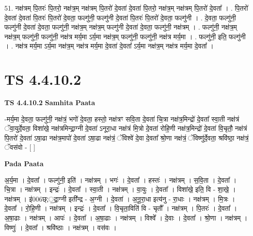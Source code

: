 \documentclass[17pt]{extarticle}
\begin{document}
51. नक्ष॑त्रम् पि॒तरः॑ पि॒तरो॒ नक्ष॑त्र॒म् नक्ष॑त्रम् पि॒तरो॑ दे॒वता॑ दे॒वता॑ पि॒तरो॒ नक्ष॑त्र॒म् नक्ष॑त्रम् पि॒तरो॑ दे॒वता᳚ । . पि॒तरो॑ दे॒वता॑ दे॒वता॑ पि॒तरः॑ पि॒तरो॑ दे॒वता॒ फल्गु॑नी॒ फल्गु॑नी दे॒वता॑ पि॒तरः॑ पि॒तरो॑ दे॒वता॒ फल्गु॑नी । . दे॒वता॒ फल्गु॑नी॒ फल्गु॑नी दे॒वता॑ दे॒वता॒ फल्गु॑नी॒ नक्ष॑त्र॒म् नक्ष॑त्र॒म् फल्गु॑नी दे॒वता॑ दे॒वता॒ फल्गु॑नी॒ नक्ष॑त्रम् । . फल्गु॑नी॒ नक्ष॑त्र॒म् नक्ष॑त्र॒म् फल्गु॑नी॒ फल्गु॑नी॒ नक्ष॑त्र मर्य॒मा ऽर्य॒मा नक्ष॑त्र॒म् फल्गु॑नी॒ फल्गु॑नी॒ नक्ष॑त्र मर्य॒मा । . फल्गु॑नी॒ इति॒ फल्गु॑नी । . नक्ष॑त्र मर्य॒मा ऽर्य॒मा नक्ष॑त्र॒म् नक्ष॑त्र मर्य॒मा दे॒वता॑ दे॒वता᳚ ऽर्य॒मा नक्ष॑त्र॒म् नक्ष॑त्र मर्य॒मा दे॒वता᳚ । \newline
\pagebreak
{}

\section{ TS 4.4.10.2 }

\textbf{TS 4.4.10.2 } \newline
\textbf{Samhita Paata} \newline

-मर्य॒मा दे॒वता॒ फल्गु॑नी॒ नक्ष॑त्रं॒ भगो॑ दे॒वता॒ हस्तो॒ नक्ष॑त्रꣳ सवि॒ता दे॒वता॑ चि॒त्रा नक्ष॑त्र॒मिन्द्रो॑ दे॒वता᳚ स्वा॒ती नक्ष॑त्रं ॅवा॒युर्दे॒वता॒ विशा॑खे॒ नक्ष॑त्रमिन्द्रा॒ग्नी दे॒वता॑ ऽनूरा॒धा नक्ष॑त्रं मि॒त्रो दे॒वता॑ रोहि॒णी नक्ष॑त्र॒मिन्द्रो॑ दे॒वता॑ वि॒चृतौ॒ नक्ष॑त्रं पि॒तरो॑ दे॒वता॑ ऽषा॒ढा नक्ष॑त्र॒मापो॑ दे॒वता॑ ऽषा॒ढा नक्ष॑त्रं॒ ॅविश्वे॑ दे॒वा दे॒वता᳚ श्रो॒णा नक्ष॑त्रं॒ ॅविष्णु॑र्दे॒वता॒ श्रवि॑ष्ठा॒ नक्ष॑त्रं॒ ॅवस॑वो - [  ] \newline

\textbf{Pada Paata} \newline

अ॒र्य॒मा । दे॒वता᳚ । फल्गु॑नी॒ इति॑ । नक्ष॑त्रम् । भगः॑ । दे॒वता᳚ । हस्तः॑ । नक्ष॑त्रम् । स॒वि॒ता । दे॒वता᳚ । चि॒त्रा । नक्ष॑त्रम् । इन्द्रः॑ । दे॒वता᳚ । स्वा॒ती । नक्ष॑त्रम् । वा॒युः । दे॒वता᳚ । विशा॑खे॒ इति॒ वि - शा॒खे॒ । नक्ष॑त्रम् । इ॑006छ्;॒द्रा॒ग्नी इती᳚न्द्र - अ॒ग्नी । दे॒वता॑ । अ॒नू॒रा॒धा इत्य॑नु - रा॒धाः । नक्ष॑त्रम् । मि॒त्रः । दे॒वता᳚ । रो॒हि॒णी । नक्ष॑त्रम् । इन्द्रः॑ । दे॒वता᳚ । वि॒चृता॒विति॑ वि - चृतौ᳚ । नक्ष॑त्रम् । पि॒तरः॑ । दे॒वता᳚ । अ॒षा॒ढाः । नक्ष॑त्रम् । आपः॑ । दे॒वता᳚ । अ॒षा॒ढाः । नक्ष॑त्रम् । विश्वे᳚ । दे॒वाः । दे॒वता᳚ । श्रो॒णा । नक्ष॑त्रम् । विष्णुः॑ । दे॒वता᳚ । श्रवि॑ष्ठाः । नक्ष॑त्रम् । वस॑वः ।  \newline
\end{document}
